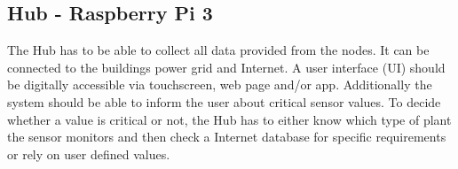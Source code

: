 \subsubsection{}

\subsection{Hub - Raspberry Pi 3}
The Hub has to be able to collect all data provided from the nodes. It can be connected to the buildings power grid and Internet. A user interface (UI) should be digitally accessible via touchscreen, web page and/or app. Additionally the system should be able to inform the user about critical sensor values. To decide whether a value is critical or not, the Hub has to either know which type of plant the sensor monitors and then check a Internet database for specific requirements or rely on user defined values.
